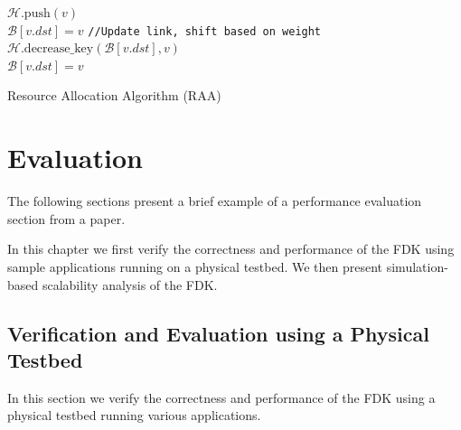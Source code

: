 \begin{algorithm}[!ht]
{{         {
            $\mathcal{H}.\mathrm{push}(v)$ \label{RAApush}\\
            $\mathcal{B}[v.dst] = v$
        }
         {
            \texttt{//Update link, shift based on weight}\\
            $\mathcal{H}.\mathrm{decrease\_key}(\mathcal{B}[v.dst], v)$ \label{RAAdecreasekey} \\
            $\mathcal{B}[v.dst] = v$
        }
    }
}

\caption{Resource Allocation Algorithm (RAA)}
\label{RAA}
\end{algorithm}









\chapter{Evaluation}
\label{Evaluation}

The following sections present a brief example of a performance evaluation section from a paper. 


In this chapter we first verify the correctness and performance of the FDK using sample applications running on a physical testbed.
We then present simulation-based scalability analysis of the FDK.

\section{Verification and Evaluation using a Physical Testbed} \label{phy_eval}

In this section we verify the correctness and performance of the FDK using a physical testbed running various applications.

